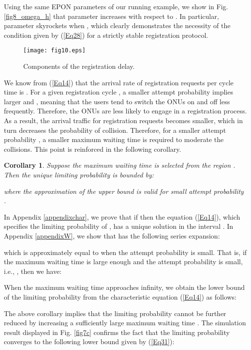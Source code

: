 \documentclass[journal]{IEEEtran}
\newtheorem{corollary}{\textbf{Corollary}}
\begin{document}
Using the same EPON parameters of our running example, we show in Fig. \ref{fig8_omega_h} that parameter  increases with respect to . In particular, parameter  skyrockets when , which clearly demonstrates the necessity of the condition given by (\ref{Eq28}) for a strictly stable registration protocol.

\begin{figure*}[t]
\centering
\texttt{[image: fig10.eps]}
\caption{Components of the registration delay.}\label{fig10}
\end{figure*}

We know from (\ref{Eq14}) that the arrival rate of registration requests per cycle time  is . For a given registration cycle , a smaller attempt probability  implies larger  and , meaning that the users tend to switch the ONUs on and off less frequently. Therefore, the ONUs are less likely to engage in a registration process. As a result, the arrival traffic for registration requests becomes smaller, which in turn decreases the probability of collision. Therefore, for a smaller attempt probability , a smaller maximum waiting time  is required to moderate the collisions. This point is reinforced in the following corollary.
\begin{corollary}\label{corollary2}
  Suppose the maximum waiting time is selected from the region . Then the unique limiting probability  is bounded by:

where the approximation of the upper bound is valid for small attempt probability .
\end{corollary}
\begin{IEEEproof}
  In Appendix \ref{appendixchar}, we prove that if  then the equation (\ref{Eq14}), which specifies the limiting probability of , has a unique solution in the interval . In Appendix \ref{appendixW}, we show that  has the following series expansion:

which is approximately equal to  when the attempt probability  is small. That is, if the maximum waiting time  is large enough and the attempt probability  is small, i.e., , then we have:

When the maximum waiting time  approaches infinity, we obtain the lower bound of the limiting probability  from the characteristic equation (\ref{Eq14}) as follows:

\end{IEEEproof}

The above corollary implies that the limiting probability  cannot be further reduced by increasing a sufficiently large maximum waiting time . The simulation result displayed in Fig. \ref{fig7c} confirms the fact that the limiting probability  converges to the following lower bound given by (\ref{Eq31}):
\end{document}

